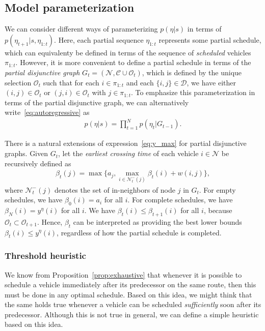 \documentclass[a4paper]{article}
\theoremstyle{definition}
\theoremstyle{plain}
\begin{document}
\subsection{Model parameterization}

We can consider different ways of parameterizing $p(\eta | s)$ in terms of
$p(\eta_{t+1} | s, \eta_{1:t})$. Here, each partial sequence $\eta_{1:t}$
represents some partial schedule, which can equivalenty be defined in terms of
the sequence of \textit{scheduled} vehicles $\pi_{1:t}$. However, it is more
convenient to define a partial schedule in terms of the \textit{partial
  disjunctive graph} $G_{t} = (\mathcal{N}, \mathcal{C} \cup \mathcal{O}_{t})$,
which is defined by the unique selection $\mathcal{O}_{t}$ such that for each
$i \in \pi_{1:t}$ and each $\{i, j\} \in \mathcal{D}$, we have either
$(i, j) \in \mathcal{O}_{t}$ or $(j, i) \in \mathcal{O}_{t}$ with
$j \in \pi_{1:t}$.
%
To emphasize this parameterization in terms of the partial disjunctive graph, we
can alternatively write~\eqref{eq:autoregressive} as
\begin{align*}
  p(\eta | s) = \prod_{t=1}^{N} p(\eta_{t} | G_{t-1}) .
\end{align*}

There is a natural extensions of expression~\eqref{eq:y_max} for partial
disjunctive graphs. Given $G_{t}$, let the \textit{earliest crossing time} of
each vehicle $i \in \mathcal{N}$ be recursively defined as
\begin{align*}
  \beta_{t}(j) = \max\{ a_{j}, \max_{i \in \mathcal{N}^{-}_{t}(j)} \beta_{t}(i) + w(i,j) \} ,
\end{align*}
where $\mathcal{N}^{-}_{t}(j)$ denotes the set of in-neighbors of node $j$ in
$G_{t}$.
%
For empty schedules, we have $\beta_{0}(i) = a_{i}$ for all $i$. For complete
schedules, we have $\beta_{N}(i) = y^{\eta}(i)$ for all $i$. We have
$\beta_{t}(i) \leq \beta_{t+1}(i)$ for all $i$, because
$\mathcal{O}_{t} \subset \mathcal{O}_{t+1}$. Hence, $\beta_{t}$ can be
interpreted as providing the best lower bounds $\beta_{t}(i) \leq y^{\eta}(i)$,
regardless of how the partial schedule is completed.

\subsubsection{Threshold heuristic}

We know from Proposition~\ref{prop:exhaustive} that whenever it is possible to schedule a vehicle
immediately after its predecessor on the same route, then this must be done in
any optimal schedule.
%
Based on this idea, we might think that the same holds true whenever a vehicle
can be scheduled \textit{sufficiently} soon after its predecessor. Although this is not
true in general, we can define a simple heuristic based on this idea.
\end{document}
